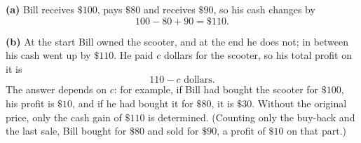 \textbf{(a)} Bill receives $\$100$, pays $\$80$ and receives $\$90$, so his cash changes by
\[100-80+90=\boxed{\$110}.\]

\textbf{(b)} At the start Bill owned the scooter, and at the end he does not; in between his cash went up by $\$110$. He paid $c$ dollars for the scooter, so his total profit on it is
\[\boxed{110-c\text{ dollars}}.\]
The answer depends on $c$: for example, if Bill had bought the scooter for $\$100$, his profit is $\$10$, and if he had bought it for $\$80$, it is $\$30$. Without the original price, only the cash gain of $\$110$ is determined. (Counting only the buy-back and the last sale, Bill bought for $\$80$ and sold for $\$90$, a profit of $\$10$ on that part.)
